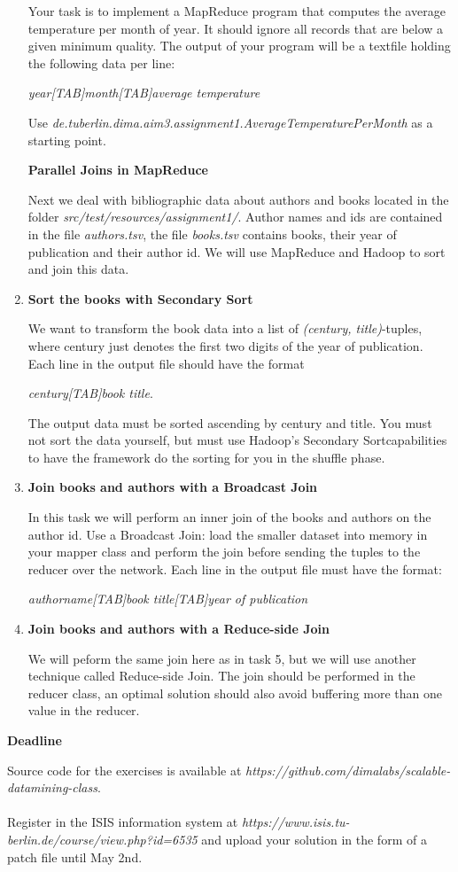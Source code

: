 \documentclass[11pt,a4paper]{article}
\begin{document}
\begin{enumerate}
Your task is to implement a MapReduce program that computes the average temperature per month of year. It should ignore all records that are below a given minimum quality. The output of your program will be a textfile holding the following data per line: 

\textit{year[TAB]month[TAB]average temperature}

Use \textit{de.tuberlin.dima.aim3.assignment1.AverageTemperaturePerMonth} as a starting point.

\newpage
\centerline{\textbf{Parallel Joins in MapReduce}}

Next we deal with bibliographic data about authors and books located in the folder \textit{src/test/resources/assignment1/}. Author names and ids are contained in the file \textit{authors.tsv}, the file \textit{books.tsv} contains books,  their year of publication and their author id. We will use MapReduce and Hadoop to sort and join this data.

\item \textbf{Sort the books with \dq{}Secondary Sort\dq}

We want to transform the book data into a list of \textit{(century, title)}-tuples, where century just denotes the first two digits of the year of publication. Each line in the output file should have the format

\textit{century[TAB]book title}.

The output data must be sorted ascending by century and title. You must not sort the data yourself, but must use Hadoop's \dq{}Secondary Sort\dq capabilities to have the framework do the sorting for you in the shuffle phase.

\item \textbf{Join books and authors with a \dq{}Broadcast Join\dq}

In this task we will perform an inner join of the books and authors on the author id. Use a \dq{}Broadcast Join\dq: load the smaller dataset into memory in your mapper class and perform the join before sending the tuples to the reducer over the network. Each line in the output file must have the format:

\textit{authorname[TAB]book title[TAB]year of publication}


\item \textbf{Join books and authors with a \dq{}Reduce-side Join\dq}

We will peform the same join here as in task 5, but we will use another technique called \dq{}Reduce-side Join\dq. The join should be performed in the reducer class, an optimal solution should also avoid buffering more than one value in the reducer.

\end{enumerate}

\bigskip
\centerline{\textbf{Deadline}}
\bigskip

Source code for the exercises is available at \textit{https://github.com/dimalabs/scalable-datamining-class}. 
\\
\\
Register in the ISIS information system at \textit{https://www.isis.tu-berlin.de/course/view.php?id=6535} and upload your solution in the form of a patch file until May 2nd.
\end{document}
